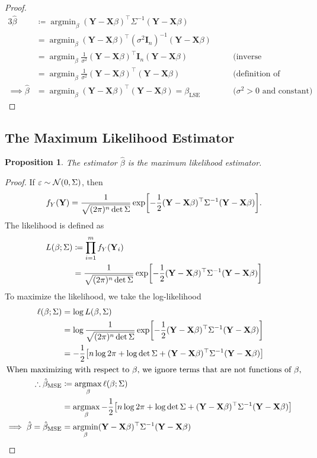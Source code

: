 \documentclass[letterpaper, reqno]{amsart}
\newtheorem{prop}{Proposition}[section]
\numberwithin{equation}{section}
\newcommand{\T}{\top} %
\newcommand{\vect}[1]{\boldsymbol{\mathbf{#1}}} %
\newcommand{\N}[2]{\mathcal{N}\mleft( #1, #2 \mright)}
\newcommand{\by}[1]{&\quad&\text{(#1)}}
\newcommand{\Xm}{\vect{X}}
\newcommand{\Yv}{\vect{Y}}
\newcommand{\Bv}{\beta}
\newcommand{\Bvh}{\hat{\beta}}
\newcommand{\ve}{\varepsilon}
\DeclareMathOperator*{\argmin}{argmin}
\DeclareMathOperator*{\argmax}{argmax}
\begin{document}
\begin{proof}
  \begin{alignat*}{3}
    \Bvh &\coloneqq \argmin_\Bv (\Yv - \Xm\Bv)^\T \Sigma^{-1} (\Yv - \Xm\Bv) \\
         &= \argmin_\Bv (\Yv - \Xm\Bv)^\T (\sigma^2 \vect{I}_n)^{-1} (\Yv - \Xm\Bv) \\
         &= \argmin_\Bv \frac{1}{\sigma^2} (\Yv - \Xm\Bv)^\T \vect{I}_n (\Yv - \Xm\Bv) \by{inverse properties} \\
         &= \argmin_\Bv \frac{1}{\sigma^2} (\Yv - \Xm\Bv)^\T (\Yv - \Xm\Bv) \by{definition of identity} \\
    \implies \Bvh &= \argmin_\Bv (\Yv - \Xm\Bv)^\T (\Yv - \Xm\Bv) = \beta_\mathrm{LSE} \by{$\sigma^2 > 0$ and constant} \tag*{\qedhere}
  \end{alignat*}
\end{proof}

\subsection{The Maximum Likelihood Estimator}
\begin{prop}
  The estimator $\Bvh$ is the maximum likelihood estimator.
\end{prop}

\begin{proof}
  If $\ve \sim \N{0}{\Sigma}$, then
  \[ f_Y(\Yv) = \frac{1}{\sqrt{(2\pi)^n \det \Sigma}}
      \exp \mleft[-\frac{1}{2} (\Yv - \Xm\Bv)^\T \Sigma^{-1} (\Yv - \Xm\Bv) \mright]. \]
  The likelihood is defined as
  \begin{align*}
    L(\Bv; \Sigma) &\coloneqq \prod_{i=1}^m f_Y(\Yv_i)  \\
    &= \frac{1}{\sqrt{(2\pi)^n \det \Sigma}}
      \exp \mleft[-\frac{1}{2} (\Yv - \Xm\Bv)^\T \Sigma^{-1} (\Yv - \Xm\Bv) \mright]
  \end{align*}
  To maximize the likelihood, we take the log-likelihood
  \begin{align*}
    \ell(\Bv; \Sigma) &= \log L(\Bv, \Sigma) \\
    &= \log \frac{1}{\sqrt{(2\pi)^n \det \Sigma}}
      \exp \mleft[-\frac{1}{2} (\Yv - \Xm\Bv)^\T \Sigma^{-1} (\Yv - \Xm\Bv) \mright] \\
    &= -\frac{1}{2} \mleft[n \log 2\pi + \log \det \Sigma 
        + (\Yv - \Xm\Bv)^\T \Sigma^{-1} (\Yv - \Xm\Bv) \mright] \\
    \intertext{When maximizing with respect to $\Bv$, we ignore terms that are
      not functions of $\Bv$,}
    \therefore \Bvh_\mathrm{MSE} &\coloneqq \argmax_\Bv \ell(\Bv; \Sigma) \\
    &= \argmax_\Bv -\frac{1}{2} \mleft[n \log 2\pi + \log \det \Sigma 
        + (\Yv - \Xm\Bv)^\T \Sigma^{-1} (\Yv - \Xm\Bv) \mright] \\
    \implies \Bvh = \Bvh_\mathrm{MSE} &= \argmin_\Bv (\Yv - \Xm\Bv)^\T \Sigma^{-1} (\Yv - \Xm\Bv)   \qedhere
  \end{align*}
\end{proof}
\end{document}
